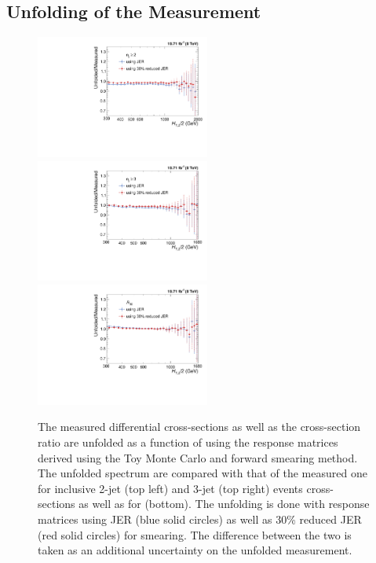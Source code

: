 \subsection{Unfolding of the Measurement}
\label{subsec:unf}
\begin{figure}[!h]
 \begin{center}
 \hspace*{-3mm}\includegraphics[width=0.51\textwidth]{Plots_HT_2_150/Ratio_Unfolding_data_NLO_2.pdf}%
 ~~\includegraphics[width=0.51\textwidth]{Plots_HT_2_150/Ratio_Unfolding_data_NLO_3.pdf}\\
 \includegraphics[width=0.51\textwidth]{Plots_HT_2_150/Ratio_Unfolding_data_NLO_ratio32.pdf}
 \caption[The measured differential cross-sections as well as the cross-section ratio \ratio are unfolded as a function of \httwo using the response matrices derived using the Toy Monte Carlo and forward smearing method.]{The measured differential cross-sections as well as the cross-section ratio \ratio are unfolded as a function of \httwo using the response matrices derived using the Toy Monte Carlo and forward smearing method. The unfolded spectrum are compared with that of the measured one for inclusive 2-jet (top left) and 3-jet (top right) events cross-sections as well as for \ratio (bottom). The unfolding is done with response matrices using JER (blue solid circles) as well as 30\% reduced JER (red solid circles) for smearing. The difference between the two is taken as an additional uncertainty on the unfolded measurement.}
 \label{fig:unfolded_data}
 \end{center}
\end{figure}

